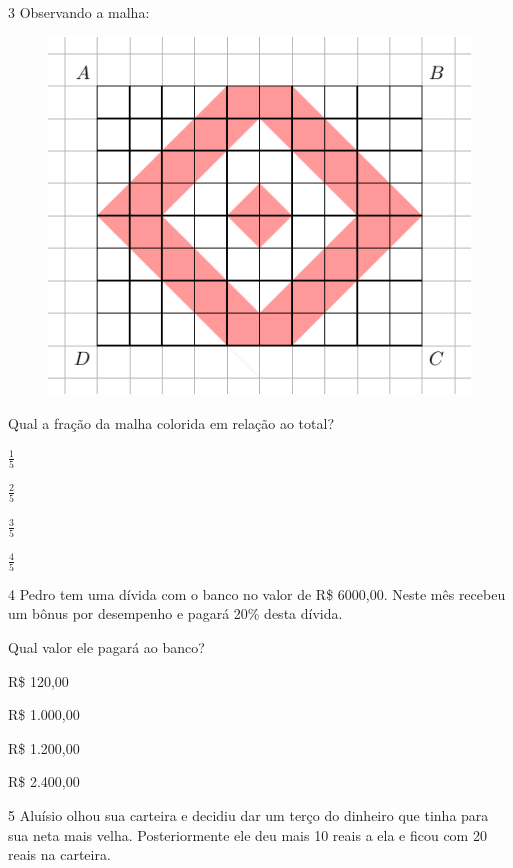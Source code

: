 \pagebreak
\num{3} Observando a malha:

\begin{figure}[htpb!]
\centering
\includegraphics[width=.5\textwidth]{./tikz/041.pdf}
\end{figure}

Qual a fração da malha colorida em relação ao total?

\begin{escolha}

  \item $\frac{1}{5}$

  \item $\frac{2}{5}$

  \item $\frac{3}{5}$

  \item $\frac{4}{5}$

\end{escolha}

\num{4} Pedro tem uma dívida com o banco no valor de R\$ 6000,00. Neste mês
recebeu um bônus por desempenho e pagará 20\% desta dívida.

Qual valor ele pagará ao banco?

\begin{escolha}

  \item R\$ 120,00

  \item R\$ 1.000,00

  \item R\$ 1.200,00

  \item R\$ 2.400,00

\end{escolha}


\num{5} Aluísio olhou sua carteira e decidiu dar um terço do dinheiro 
que tinha para sua neta mais velha. Posteriormente ele deu mais 10 reais 
a ela e ficou com 20 reais na carteira.

